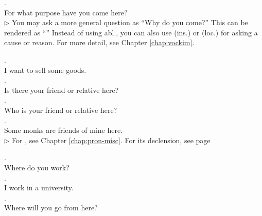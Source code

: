 \medskip
{}. \\
\hspace*{12mm}For what purpose have you come here?\\
{\small $\triangleright$ You may ask a more general question as ``Why do you come?'' This can be rendered as ``'' Instead of using abl., you can also use  (ins.) or  (loc.) for asking a cause or reason. For more detail, see Chapter \ref{chap:vockim}.}

\medskip
{}. \\
\hspace*{12mm}I want to sell some goods.\\

\medskip
{}. \\
\hspace*{12mm}Is there your friend or relative here?\\

\medskip
{}. \\
\hspace*{12mm}Who is your friend or relative here?\\

\medskip
{}. \\
\hspace*{12mm}Some monks are friends of mine here.\\
{\small $\triangleright$ For , see Chapter \ref{chap:pron-misc}. For its declension, see page \pageref{decl:koci}}

\medskip
{}. \\
\hspace*{12mm}Where do you work?\\

\medskip
{}. \\
\hspace*{12mm}I work in a university.\\

\medskip
{}. \\
\hspace*{12mm}Where will you go from here?\\

